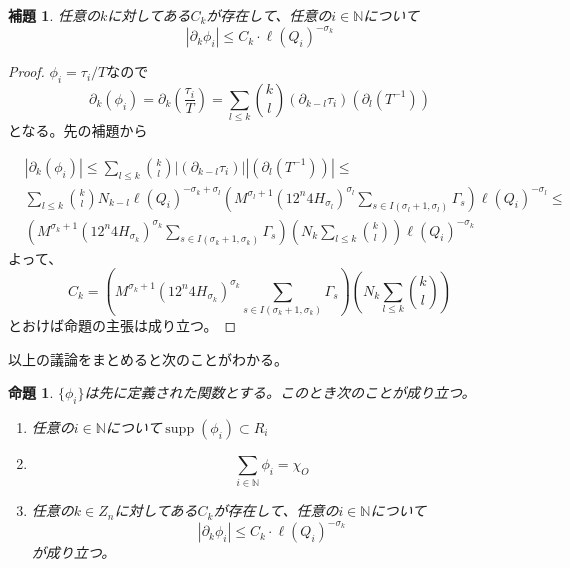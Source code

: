 \documentclass[leqno]{jsarticle}
\newtheorem{prop}[thm]{命題}
\newtheorem{lem}[thm]{補題}
\newcommand{\nn}{\mathbb{N}}
\DeclareMathOperator{\supp}{supp}
\begin{document}
\begin{lem}
任意の$k$に対してある$C_{k}$が存在して、任意の$i\in \nn$について
\[
|\partial_k\phi_i|\le C_k\cdot\ell(Q_i)^{-\sigma_k}
\]
\end{lem}
\begin{proof}
$\phi_i=\tau_i/T$なので
\[
\partial_k(\phi_i)=
\partial_k\left(\frac{\tau_i}{T}\right)=
\sum_{l\le k}\binom{k}{l}(\partial_{k-l}\tau_i)(\partial_l(T^{-1}))
\]
となる。先の補題から

\begin{align*}
&|\partial_k(\phi_i)|\le 
\sum_{l\le k}\binom{k}{l}|(\partial_{k-l}\tau_i)||(\partial_l(T^{-1}))|\le\\
&\sum_{l\le k} \binom{k}{l}N_{k-l}\ell(Q_i)^{-\sigma_{k}+\sigma_l}
\left(M^{\sigma_l+1}(12^n4H_{\sigma_l})^{\sigma_l}\sum_{s\in I(\sigma_l+1,\sigma_l)}\Gamma_s\right)\ell(Q_i)^{-\sigma_l}\le \\
&\left(M^{\sigma_k+1}(12^n4H_{\sigma_k})^{\sigma_k}\sum_{s\in I(\sigma_k+1,\sigma_k)}\Gamma_s\right)\left(N_k\sum_{l\le k}\binom{k}{l}\right)
\ell(Q_i)^{-\sigma_k}
\end{align*}
よって、
\[
C_k=\left(M^{\sigma_k+1}(12^n4H_{\sigma_k})^{\sigma_k}\sum_{s\in I(\sigma_k+1,\sigma_k)}\Gamma_s\right)\left(N_k\sum_{l\le k}\binom{k}{l}\right)
\]
とおけば命題の主張は成り立つ。
\end{proof}
以上の議論をまとめると次のことがわかる。
\begin{prop}\label{pou}
$\{\phi_i\}$は先に定義された関数とする。このとき次のことが成り立つ。
\begin{enumerate}
\item 任意の$i\in \nn$について$\supp(\phi_i)\subset R_i$
\item 
\[
\sum_{i\in \nn}\phi_i=\chi_O
\]
\item 任意の$k\in Z_n$に対してある$C_{k}$が存在して、任意の$i\in \nn$について
\[
|\partial_k\phi_i|\le C_k\cdot\ell(Q_i)^{-\sigma_k}
\]が成り立つ。
\end{enumerate}
\end{prop}
\end{document}
